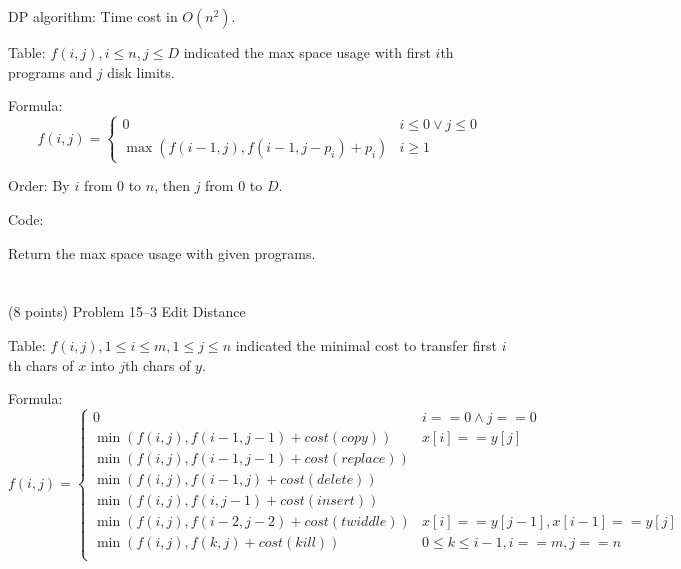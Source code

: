 \documentclass[paper=a4, fontsize=11pt]{scrartcl} %
\begin{document}
\begin{enumerate}
  DP algorithm: Time cost in $O(n^2)$.

  Table:
  $f(i,j), i\leq n, j\leq D$ indicated the max space usage with first
  $i$th programs and $j$ disk limits.

  Formula:
  \begin{equation*}
    f(i,j) =
    \begin{cases}
      0 & i\leq 0 \lor j\leq 0\\
      \max(f(i-1,j), f(i-1,j-p_i)+p_i) & i\geq 1
    \end{cases}
  \end{equation*}

  Order:
  By $i$ from $0$ to $n$, then $j$ from $0$ to $D$.

  Code:
  \begin{algorithm}[H]
    \caption{Return the max space usage with given programs.}
  \end{algorithm}

\end{enumerate}
\pagebreak

\section{}

\begin{fancyquotes}
  (8 points) Problem 15--3 Edit Distance
\end{fancyquotes}

Table:
$f(i,j), 1\leq i\leq m, 1\leq j\leq n$ indicated the minimal cost to
transfer first $i$th chars of $x$ into $j$th chars of $y$.

Formula:
\begin{equation*}
  f(i,j) =
  \begin{cases}
    0 & i==0 \land j==0\\

    \min(f(i,j), f(i-1,j-1)+cost(copy)) & x[i]==y[j]\\
    \min(f(i,j), f(i-1,j-1)+cost(replace))\\
    \min(f(i,j), f(i-1,j)+cost(delete))\\
    \min(f(i,j), f(i,j-1)+cost(insert))\\
    \min(f(i,j), f(i-2,j-2)+cost(twiddle)) & x[i]==y[j-1],
    x[i-1]==y[j]\\
    \min(f(i,j), f(k,j)+cost(kill)) & 0\leq k\leq i-1, i==m, j==n\\
  \end{cases}
\end{equation*}
\end{document}
